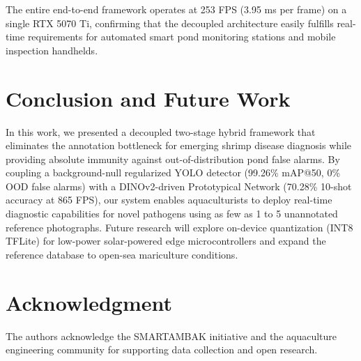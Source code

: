 \documentclass[conference]{IEEEtran}
\begin{document}
The entire end-to-end framework operates at 253 FPS (3.95 ms per frame) on a single RTX 5070 Ti, confirming that the decoupled architecture easily fulfills real-time requirements for automated smart pond monitoring stations and mobile inspection handhelds.

\section{Conclusion and Future Work}

In this work, we presented a decoupled two-stage hybrid framework that eliminates the annotation bottleneck for emerging shrimp disease diagnosis while providing absolute immunity against out-of-distribution pond false alarms. By coupling a background-null regularized YOLO detector (99.26\% mAP@50, 0\% OOD false alarms) with a DINOv2-driven Prototypical Network (70.28\% 10-shot accuracy at 865 FPS), our system enables aquaculturists to deploy real-time diagnostic capabilities for novel pathogens using as few as 1 to 5 unannotated reference photographs. Future research will explore on-device quantization (INT8 TFLite) for low-power solar-powered edge microcontrollers and expand the reference database to open-sea mariculture conditions.

\section*{Acknowledgment}
The authors acknowledge the SMARTAMBAK initiative and the aquaculture engineering community for supporting data collection and open research.
\end{document}
